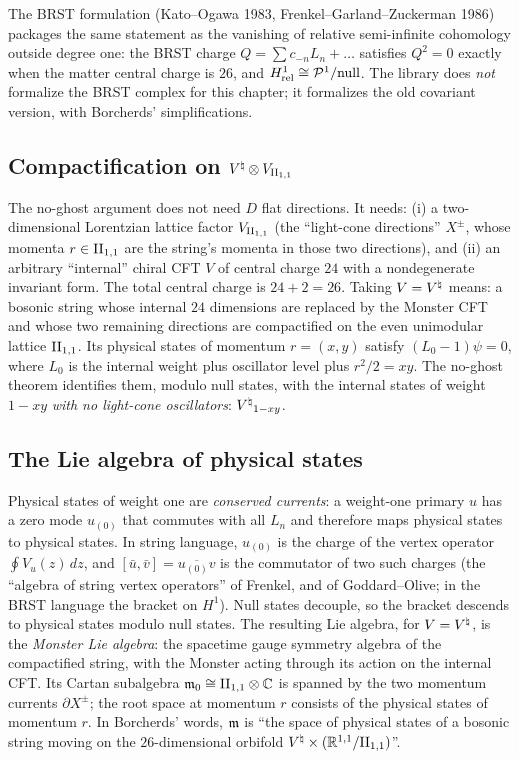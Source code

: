 The BRST formulation (Kato--Ogawa 1983, Frenkel--Garland--Zuckerman 1986) packages the same statement
as the vanishing of relative semi-infinite cohomology outside degree one: the BRST charge
$Q=\sum c_{-n}L_n+\dots$ satisfies $Q^2=0$ exactly when the matter central charge is $26$, and
$H^1_{\mathrm{rel}}\cong\mathcal{P}^1/\text{null}$.  The library does \emph{not} formalize the BRST complex
for this chapter; it formalizes the old covariant version, with Borcherds' simplifications.

\subsection{\texorpdfstring{Compactification on ${V^{\natural}}\otimes V_{\mathrm{II}_{1,1}}$}{Compactification on V-natural tensor V(II11)}}

The no-ghost argument does not need $D$ flat directions.  It needs: (i) a two-dimensional
Lorentzian lattice factor $V_{\mathrm{II}_{1,1}}$ (the ``light-cone directions'' $X^\pm$, whose momenta $r\in\mathrm{II}_{1,1}$
are the string's momenta in those two directions), and (ii) an arbitrary ``internal'' chiral CFT $V$ of
central charge $24$ with a nondegenerate invariant form.  The total central charge is $24+2=26$.  Taking
$V={V^{\natural}}$ means: a bosonic string whose internal $24$ dimensions are replaced by the Monster CFT and
whose two remaining directions are compactified on the even unimodular lattice $\mathrm{II}_{1,1}$.  Its
physical states of momentum $r=(x,y)$ satisfy $(L_0-1)\psi=0$, where $L_0$ is the internal weight plus
oscillator level plus $r^2/2=xy$.  The no-ghost theorem identifies them, modulo null states, with the
internal states of weight $1-xy$ \emph{with no light-cone oscillators}: ${V^{\natural}}_{1-xy}$.

\subsection{The Lie algebra of physical states}

Physical states of weight one are \emph{conserved currents}: a weight-one primary $u$ has a zero mode
$u_{(0)}$ that commutes with all $L_n$ and therefore maps physical states to physical states.  In
string language, $u_{(0)}$ is the charge of the vertex operator $\oint V_u(z)\,dz$, and $[\bar u,\bar
v]=\overline{u_{(0)}v}$ is the commutator of two such charges (the ``algebra of string vertex
operators'' of Frenkel, and of Goddard--Olive; in the BRST language the bracket on $H^1$).  Null
states decouple, so the bracket descends to physical states modulo null states.  The resulting Lie
algebra, for $V={V^{\natural}}$, is the \emph{Monster Lie algebra}: the spacetime gauge symmetry algebra of the
compactified string, with the Monster acting through its action on the internal CFT.  Its Cartan
subalgebra $\mathfrak{m}_0\cong\mathrm{II}_{1,1}\otimes\mathbb C$ is spanned by the two momentum currents
$\partial X^\pm$; the root space at momentum $r$ consists of the physical states of momentum $r$.  In
Borcherds' words, $\mathfrak{m}$ is ``the space of physical states of a bosonic string moving on the
$26$-dimensional orbifold ${V^{\natural}}\times(\mathbb R^{1,1}/\mathrm{II}_{1,1})$''.

